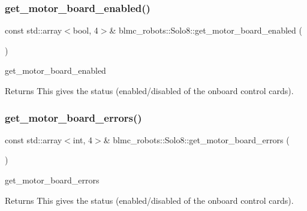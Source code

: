 \subsubsection{\texorpdfstring{get\+\_\+motor\+\_\+board\+\_\+enabled()}{get\_motor\_board\_enabled()}}
{\footnotesize\ttfamily const std\+::array$<$bool, 4$>$\& blmc\+\_\+robots\+::\+Solo8\+::get\+\_\+motor\+\_\+board\+\_\+enabled (\begin{DoxyParamCaption}{ }\end{DoxyParamCaption})\hspace{0.3cm}{\ttfamily [inline]}}



get\+\_\+motor\+\_\+board\+\_\+enabled 

\begin{DoxyReturn}{Returns}
This gives the status (enabled/disabled of the onboard control cards). 
\end{DoxyReturn}
\mbox{\label{classblmc__robots_1_1Solo8_aad29e62a4dbbba13f0ea80dc7631f23c}} 
\subsubsection{\texorpdfstring{get\+\_\+motor\+\_\+board\+\_\+errors()}{get\_motor\_board\_errors()}}
{\footnotesize\ttfamily const std\+::array$<$int, 4$>$\& blmc\+\_\+robots\+::\+Solo8\+::get\+\_\+motor\+\_\+board\+\_\+errors (\begin{DoxyParamCaption}{ }\end{DoxyParamCaption})\hspace{0.3cm}{\ttfamily [inline]}}



get\+\_\+motor\+\_\+board\+\_\+errors 

\begin{DoxyReturn}{Returns}
This gives the status (enabled/disabled of the onboard control cards). 
\end{DoxyReturn}
\mbox{\label{classblmc__robots_1_1Solo8_a9ebe42874824fddf80f726123740a08c}} 
